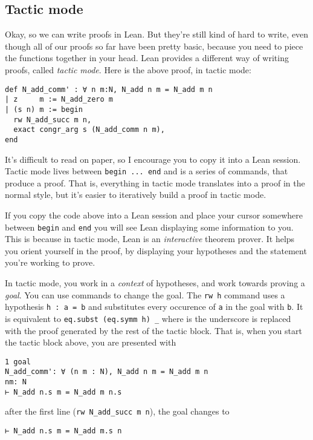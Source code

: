 \documentclass[a4paper, 12pt]{article}
\newcommand{\lean}[1]{\texttt{#1}}
\theoremstyle{changedot}
\theoremstyle{changedotbreak}
\theoremstyle{nonumberplain}
\begin{document}
\subsection{Tactic mode}
Okay, so we can write proofs in Lean. But they're still kind of hard to write, even though all of our proofs so far have been pretty basic, because you need to piece the functions together in your head. Lean provides a different way of writing proofs, called \textit{tactic mode}. Here is the above proof, in tactic mode:

\begin{verbatim}
def N_add_comm' : ∀ n m:N, N_add n m = N_add m n
| z     m := N_add_zero m
| (s n) m := begin
  rw N_add_succ m n,
  exact congr_arg s (N_add_comm n m),
end
\end{verbatim}

It's difficult to read on paper, so I encourage you to copy it into a Lean session. Tactic mode lives between \texttt{begin ... end} and is a series of commands, that produce a proof. That is, everything in tactic mode translates into a proof in the normal style, but it's easier to iteratively build a proof in tactic mode.

If you copy the code above into a Lean session and place your cursor somewhere between \lean{begin} and \lean{end} you will see Lean displaying some information to you. This is because in tactic mode, Lean is an \textit{interactive} theorem prover. It helps you orient yourself in the proof, by displaying your hypotheses and the statement you're working to prove.

In tactic mode, you work in a \textit{context} of hypotheses, and work towards proving a \textit{goal}. You can use commands to change the goal. The \lean{rw h} command uses a hypothesis \lean{h : a = b} and substitutes every occurence of \lean{a} in the goal with \lean{b}. It is equivalent to \lean{eq.subst (eq.symm h) _} where is the underscore is replaced with the proof generated by the rest of the tactic block. That is, when you start the tactic block above, you are presented with
\begin{verbatim}
1 goal
N_add_comm': ∀ (n m : N), N_add n m = N_add m n
nm: N
⊢ N_add n.s m = N_add m n.s
\end{verbatim}

after the first line (\lean{rw N_add_succ m n}), the goal changes to

\begin{verbatim}
⊢ N_add n.s m = N_add m.s n
\end{verbatim}
\end{document}
